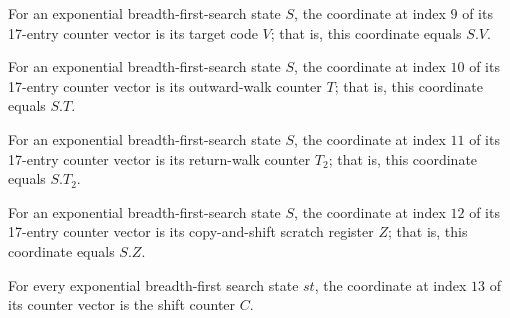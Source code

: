 \begin{lemma}
\label{Complexity.LogProg.ExpBFS.St.toV_V}
\leanok
{}
For an exponential breadth-first-search state $S$, the coordinate at index $9$ of its
17-entry counter vector is its target code $V$; that is, this coordinate equals $S.V$.
\end{lemma}

\begin{lemma}
\label{Complexity.LogProg.ExpBFS.St.toV_T}
\leanok
{}
For an exponential breadth-first-search state $S$, the coordinate at index $10$ of its
17-entry counter vector is its outward-walk counter $T$; that is, this coordinate equals
$S.T$.
\end{lemma}

\begin{lemma}
\label{Complexity.LogProg.ExpBFS.St.toV_T2}
\leanok
{}
For an exponential breadth-first-search state $S$, the coordinate at index $11$ of its
17-entry counter vector is its return-walk counter $T_2$; that is, this coordinate
equals $S.T_2$.
\end{lemma}

\begin{lemma}
\label{Complexity.LogProg.ExpBFS.St.toV_Z}
\leanok
{}
For an exponential breadth-first-search state $S$, the coordinate at index $12$ of its
17-entry counter vector is its copy-and-shift scratch register $Z$; that is, this
coordinate equals $S.Z$.
\end{lemma}

\begin{lemma}
\label{Complexity.LogProg.ExpBFS.St.toV_C}
\leanok
{}
For every exponential breadth-first search state $st$, the coordinate at index $13$ of
its counter vector is the shift counter $C$.
\end{lemma}

